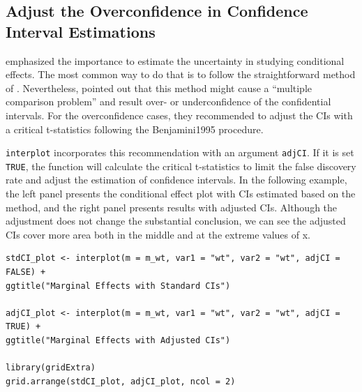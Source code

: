 \documentclass[
  article]{jss}
\begin{document}
\hypertarget{sec-adjust-the-overconfidence-in-confidence-interval-estimations}{%
\subsection{Adjust the Overconfidence in Confidence Interval
Estimations}\label{sec-adjust-the-overconfidence-in-confidence-interval-estimations}}

\citep{BerryDeMerittEsarey2016} emphasized the importance to estimate
the uncertainty in studying conditional effects. The most common way to
do that is to follow the straightforward method of
\citep{BramborClarkGolder2006}. Nevertheless, \citep{EsareySumner2018}
pointed out that this method might cause a ``multiple comparison
problem'' and result over- or underconfidence of the confidential
intervals. For the overconfidence cases, they recommended to adjust the
CIs with a critical t-statistics following the Benjamini1995 procedure.

\texttt{interplot} incorporates this recommendation with an argument
\texttt{adjCI}. If it is set \texttt{TRUE}, the function will calculate
the critical t-statistics to limit the false discovery rate and adjust
the estimation of confidence intervals. In the following example, the
left panel presents the conditional effect plot with CIs estimated based
on the \citep{BramborClarkGolder2006} method, and the right panel
presents results with adjusted CIs. Although the adjustment does not
change the substantial conclusion, we can see the adjusted CIs cover
more area both in the middle and at the extreme values of x.

\begin{verbatim}
stdCI_plot <- interplot(m = m_wt, var1 = "wt", var2 = "wt", adjCI = FALSE) +
ggtitle("Marginal Effects with Standard CIs")

adjCI_plot <- interplot(m = m_wt, var1 = "wt", var2 = "wt", adjCI = TRUE) +
ggtitle("Marginal Effects with Adjusted CIs")

library(gridExtra)
grid.arrange(stdCI_plot, adjCI_plot, ncol = 2)
\end{verbatim}
\end{document}
